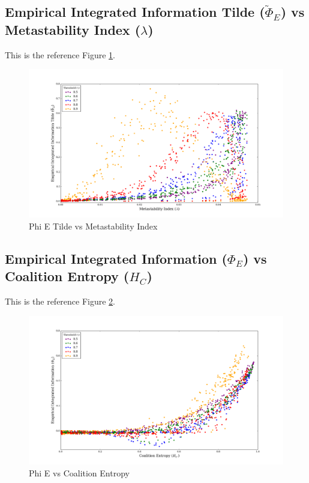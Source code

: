 \documentclass[a4paper,11pt]{article}
\begin{document}
\subsection{Empirical Integrated Information Tilde ($\widetilde{\Phi}_{E}$) vs Metastability Index ($\lambda$)}

This is the reference Figure \ref{fig:phi-tilde-vs-lambda-multi}.

\begin{figure}[H]
\begin{center}
\includegraphics[scale = 0.35]{figures/phi_tilde_vs_lambda_multi}
\caption{
	Phi E Tilde vs Metastability Index
	\label{fig:phi-tilde-vs-lambda-multi}
}
\end{center}
\end{figure}

\subsection{Empirical Integrated Information ($\Phi_{E}$) vs Coalition Entropy ($H_C$)}

This is the reference Figure \ref{fig:phi-vs-hc-multi}.

\begin{figure}[H]
\begin{center}
\includegraphics[scale = 0.35]{figures/phi_vs_hc_multi}
\caption{
	Phi E vs Coalition Entropy
	\label{fig:phi-vs-hc-multi}
}
\end{center}
\end{figure}
\end{document}

